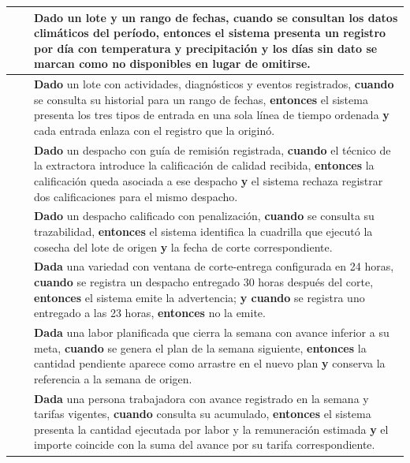 \begin{longtable}{|C{1.5cm}|C{1.5cm}|L{12.4cm}|}
 &  & \textbf{Dado} un lote y un rango de fechas, \textbf{cuando} se consultan los datos climáticos del período, \textbf{entonces} el sistema presenta un registro por día con temperatura y precipitación \textbf{y} los días sin dato se marcan como no disponibles en lugar de omitirse. \\ \hline

 &  & \textbf{Dado} un lote con actividades, diagnósticos y eventos registrados, \textbf{cuando} se consulta su historial para un rango de fechas, \textbf{entonces} el sistema presenta los tres tipos de entrada en una sola línea de tiempo ordenada \textbf{y} cada entrada enlaza con el registro que la originó. \\ \hline

 &  & \textbf{Dado} un despacho con guía de remisión registrada, \textbf{cuando} el técnico de la extractora introduce la calificación de calidad recibida, \textbf{entonces} la calificación queda asociada a ese despacho \textbf{y} el sistema rechaza registrar dos calificaciones para el mismo despacho. \\ \hline

 &  & \textbf{Dado} un despacho calificado con penalización, \textbf{cuando} se consulta su trazabilidad, \textbf{entonces} el sistema identifica la cuadrilla que ejecutó la cosecha del lote de origen \textbf{y} la fecha de corte correspondiente. \\ \hline

 &  & \textbf{Dada} una variedad con ventana de corte-entrega configurada en 24 horas, \textbf{cuando} se registra un despacho entregado 30 horas después del corte, \textbf{entonces} el sistema emite la advertencia; \textbf{y cuando} se registra uno entregado a las 23 horas, \textbf{entonces} no la emite. \\ \hline

 &  & \textbf{Dada} una labor planificada que cierra la semana con avance inferior a su meta, \textbf{cuando} se genera el plan de la semana siguiente, \textbf{entonces} la cantidad pendiente aparece como arrastre en el nuevo plan \textbf{y} conserva la referencia a la semana de origen. \\ \hline

 &  & \textbf{Dada} una persona trabajadora con avance registrado en la semana y tarifas vigentes, \textbf{cuando} consulta su acumulado, \textbf{entonces} el sistema presenta la cantidad ejecutada por labor y la remuneración estimada \textbf{y} el importe coincide con la suma del avance por su tarifa correspondiente. \\ \hline


\end{longtable}

